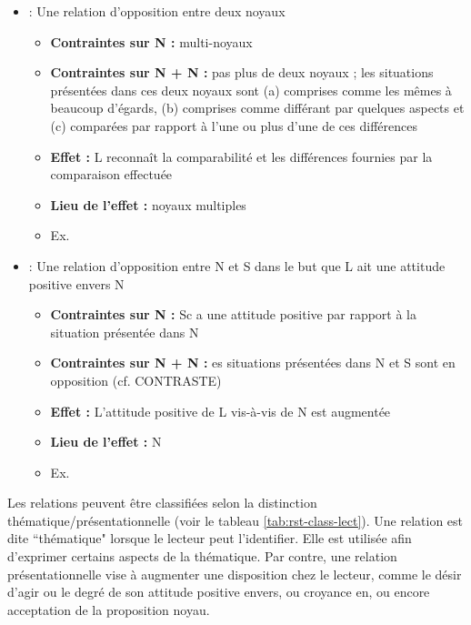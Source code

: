 \documentclass{KodeBook}
\begin{document}
\begin{itemize}
	\item {} :  Une relation d'opposition entre deux noyaux
	\begin{itemize}
		\item \textbf{Contraintes sur N :} multi-noyaux
		\item \textbf{Contraintes sur N + N :} pas plus de deux noyaux ; les situations présentées dans ces deux noyaux sont (a) comprises comme les mêmes à beaucoup d'égards, (b) comprises comme différant par quelques aspects et (c) comparées par rapport à l'une ou plus d'une de ces différences
		\item \textbf{Effet :}  L reconnaît la comparabilité et les différences fournies par la comparaison effectuée
		\item \textbf{Lieu de l'effet :} noyaux multiples
		\item Ex. 
	\end{itemize}

	\item {} :  Une relation d'opposition entre N et S dans le but que L ait une attitude positive envers N
	\begin{itemize}
		\item \textbf{Contraintes sur N :} Sc a une attitude positive par rapport à la situation présentée dans N
		\item \textbf{Contraintes sur N + N :} es situations présentées dans N et S sont en opposition (cf. CONTRASTE)
		\item \textbf{Effet :}  L'attitude positive de L vis-à-vis de N est augmentée
		\item \textbf{Lieu de l'effet :} N
		\item Ex. 
	\end{itemize}
\end{itemize}

Les relations  peuvent être classifiées selon la distinction thématique/présentationnelle (voir le tableau \ref{tab:rst-class-lect}). 
Une relation est dite ``thématique" lorsque le lecteur peut l'identifier.
Elle est utilisée afin d'exprimer certains aspects de la thématique. 
Par contre, une  relation présentationnelle vise à augmenter une disposition chez le lecteur, comme le désir d'agir ou le degré de son attitude positive envers, ou croyance en, ou encore acceptation de la proposition noyau. 
\end{document}
